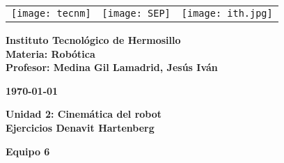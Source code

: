 \label{key}\begin{titlepage}
	\centering
	\begin{tabular}{@{}p{} p{} p{}@{}}
		\texttt{[image: tecnm]} & 
		\centering \texttt{[image: SEP]} & 
		\raggedleft \texttt{[image: ith.jpg]} \\
	\end{tabular}
	
	\vspace{2em}
	
	\noindent
	\begin{minipage}[t]{0.48\textwidth}
		\raggedright
		\small \textbf{%
			Instituto Tecnológico de Hermosillo\\
			Materia: Robótica\\
			Profesor: Medina Gil Lamadrid, Jesús Iván%
		}
	\end{minipage}%
	\hfill
	\begin{minipage}[t]{0.48\textwidth}
		\raggedleft
		\small \textbf{\today}
	\end{minipage}
	
	\vspace{2em}
	
	{\large \textbf{Unidad 2: Cinemática del robot}}\\
	{\Huge \textbf{Ejercicios Denavit Hartenberg}}
		
	\vspace{1em}
	
	\begin{center}
		{\Large \textbf{Equipo 6}}
	\end{center}
	
	\vspace{1em}
	

\end{titlepage}

